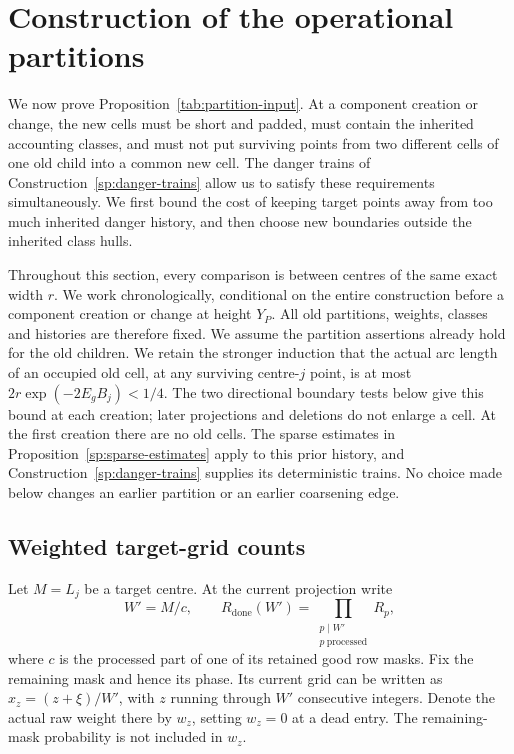 \section{Construction of the operational partitions}
\label{sec:partitions}

We now prove Proposition~\ref{tab:partition-input}.  At a component
creation or change, the new cells must be short and padded, must contain
the inherited accounting classes, and must not put surviving points from
two different cells of one old child into a common new cell.  The danger
trains of Construction~\ref{sp:danger-trains} allow us to satisfy these
requirements simultaneously.  We first bound the cost of keeping target
points away from too much inherited danger history, and then choose new
boundaries outside the inherited class hulls.

Throughout this section, every comparison is between centres of the same
exact width $r$.  We work chronologically, conditional on the entire
construction before a component creation or change at height $Y_P$.
All old partitions, weights, classes and histories are therefore fixed.
We assume the partition assertions already hold for the old children.
We retain the stronger induction that the actual arc length of an
occupied old cell, at any surviving centre-$j$ point, is at most
$2r\exp(-2E_gB_j)<1/4$.  The two directional boundary tests below
give this bound at each creation; later projections and deletions
do not enlarge a cell.  At the first creation there are no old cells.
The sparse estimates in Proposition~\ref{sp:sparse-estimates} apply to this
prior history, and Construction~\ref{sp:danger-trains} supplies its
deterministic trains.  No choice made below changes an earlier partition
or an earlier coarsening edge.

\subsection{Weighted target-grid counts}

Let $M=L_j$ be a target centre.  At the current projection write
\[
 W'=M/c,
 \qquad
 R_{\mathrm{done}}(W')
   =\prod_{\substack{p\mid W'\\p\ \mathrm{processed}}}R_p,
\]
where $c$ is the processed part of one of its retained good row masks.
Fix the remaining mask and hence its phase.  Its current grid can be written as
$x_z=(z+\xi)/W'$, with $z$ running through $W'$ consecutive integers.
Denote the actual raw weight there by $w_z$, setting $w_z=0$ at a dead
entry.  The remaining-mask probability is not included in $w_z$.

